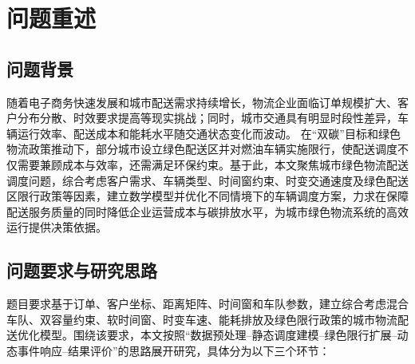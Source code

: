 \documentclass[withoutpreface,bwprint]{cumcmthesis} %
\begin{document}
\begin{abstract}
\begin{enumerate}[leftmargin=2em,itemsep=0.06em,topsep=0.15em,parsep=0pt]
    \item {\heiti 精细成本评价：}将时变车速、载荷修正、油电能耗、碳排放成本、等待成本和迟到惩罚统一纳入路径评估器，能够逐弧计算车辆运行成本并解释成本变化来源。

    \item {\heiti 分场景算法适配：}静态与绿色限行情形采用 ALNS 进行全局路径优化，动态事件采用 LNS--VNS 进行局部重优化，在求解质量、实时响应和路径稳定性之间取得平衡。
\end{enumerate}

\vspace{0.2em}
绿色物流；车辆路径优化；软时间窗；ALNS；LNS--VNS

\end{abstract}

\tableofcontents
\clearpage


\setcounter{page}{1}
\newpage


\section{问题重述}

\subsection{问题背景}

随着电子商务快速发展和城市配送需求持续增长，物流企业面临订单规模扩大、客户分布分散、时效要求提高等现实挑战；同时，城市交通具有明显时段性差异，车辆运行效率、配送成本和能耗水平随交通状态变化而波动。
在“双碳”目标和绿色物流政策推动下，部分城市设立绿色配送区并对燃油车辆实施限行，使配送调度不仅需要兼顾成本与效率，还需满足环保约束。基于此，本文聚焦城市绿色物流配送调度问题，综合考虑客户需求、车辆类型、时间窗约束、时变交通速度及绿色配送区限行政策等因素，建立数学模型并优化不同情境下的车辆调度方案，力求在保障配送服务质量的同时降低企业运营成本与碳排放水平，为城市绿色物流系统的高效运行提供决策依据。


\subsection{问题要求与研究思路}

题目要求基于订单、客户坐标、距离矩阵、时间窗和车队参数，建立综合考虑混合车队、双容量约束、软时间窗、时变车速、能耗排放及绿色限行政策的城市物流配送优化模型。围绕该要求，本文按照“数据预处理--静态调度建模--绿色限行扩展--动态事件响应--结果评价”的思路展开研究，具体分为以下三个环节：
\end{document}
